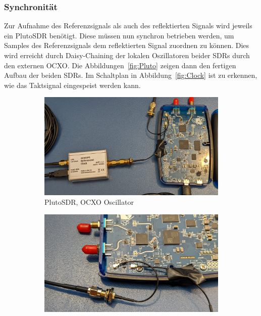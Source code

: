 \subsubsection{Synchronität}\label{sct:Oscillator}
Zur Aufnahme des Referenzsignals als auch des reflektierten Signals wird jeweils ein PlutoSDR benötigt. Diese müssen nun synchron betrieben werden, um Samples des Referenzsignals dem reflektierten Signal zuordnen zu können. Dies wird erreicht durch Daisy-Chaining der lokalen Oszillatoren beider SDRs durch den externen OCXO. Die Abbildungen~\ref{fig:Pluto} zeigen dann den fertigen Aufbau der beiden SDRs. Im Schaltplan in Abbildung~\ref{fig:Clock} ist zu erkennen, wie das Taktsignal eingespeist werden kann.

\begin{figure}
    \centering
    \begin{subfigure}[Pluto mit Clock]{0.3\textwidth}
        \includegraphics[width=\textwidth]{images/Pluto_1.jpeg}
        \caption{PlutoSDR, OCXO Oscillator}
    \end{subfigure}
    \begin{subfigure}[Daisy Chaining]{0.3\textwidth}
        \includegraphics[width=\textwidth]{images/Pluto_2.jpeg}

\end{subfigure}
\end{figure}
